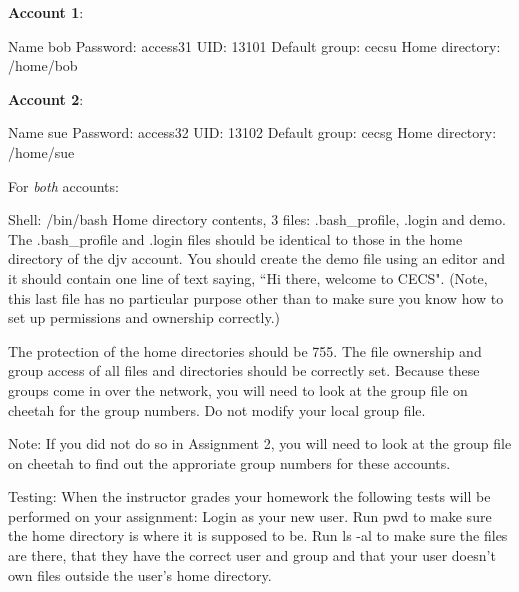 {\bf Account 1}:

Name {\ltt{}bob}
\break
Password: access31
\break
UID: {\ltt{}13101}
\break
Default group: {\ltt{}cecsu}
\break
Home directory: {\ltt{}/home/bob}

{\bf Account 2}:

Name {\ltt{}sue}
\break
Password: access32
\break
UID: {\ltt{}13102}
\break
Default group: {\ltt{}cecsg}
\break
Home directory: {\ltt{}/home/sue}

For {\it both} accounts:

Shell: {\ltt{}/bin/bash}
\break
Home directory contents, 3 files:
{\ltt{}.bash_profile}, {\ltt{}.login} and {\ltt{}demo}.
\break
The {\ltt{}.bash_profile} and {\ltt{}.login} files should be identical 
to those in the home directory of the {\ltt{}djv} account.
You should create the {\ltt{}demo} file using an editor
and it should contain one line of text saying,
``Hi there, welcome to CECS". 
(Note, this last file has no particular purpose other than
to make sure you know how to set up permissions and ownership correctly.)

The protection of the home directories should be 755.
The file ownership and group access of all files and directories
should be correctly set.
Because these groups come in over the network,
you will need to look at the {\ltt{}group} file on {\ltt{}cheetah}
for the group numbers.
Do not modify your local {\ltt{}group} file.

Note:
If you did not do so in Assignment 2,
you will need to look at the group file on cheetah to find out
the approriate group numbers for these accounts.

Testing:
\break
When the instructor grades your homework the following tests will be
performed on your assignment:
Login as your new user. Run {\ltt{}pwd} to make sure the home directory
is where it is supposed to be.
Run {\ltt{}ls -al} to make sure the files are there, that they have
the correct user and group and that your user doesn't own files
outside the user's home directory.
\bye
